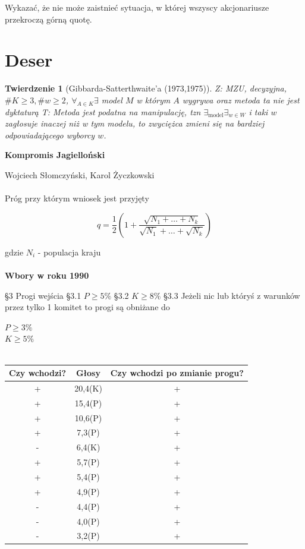 \documentclass[12pt,a4paper]{article}
\theoremstyle{break}
\newtheorem{theorem}{Twierdzenie}[section]
\begin{document}
	\begin{zad}
		Wykazać, że nie może zaistnieć sytuacja, w której wszyscy akcjonariusze przekroczą górną quotę.
	\end{zad}
	
	
	\newpage
	\section{Deser}
	
	\begin{theorem}[Gibbarda-Satterthwaite'a (1973,1975)]
		Z: MZU, decyzyjna, $\# K \geq 3, \# w \geq 2$, $\forall_{A\in K} \exists$ model $M$ w którym $A$ wygrywa oraz metoda ta nie jest dyktaturą
		T: Metoda jest podatna na manipulację, tzn 	$\exists_{ \text{model}} \exists_{w \in W}$ i taki $w$ zagłosuje inaczej niż w tym modelu, to zwyciężca zmieni się na bardziej odpowiadającego wyborcy $w$.
	\end{theorem}
	
	{\textbf{Kompromis Jagielloński}}
	
	Wojciech Słomczyński, Karol Życzkowski\\\\
	
	Próg przy którym wniosek jest przyjęty
	
	$$q=\frac{1}{2} \left(1+\frac{\sqrt{N_1+\dots+N_k}}{\sqrt{N_1}+\dots+\sqrt{N_k}}\right)$$ 
	
	gdzie $N_i$ - populacja kraju\\\\
	
	{\textbf{Wbory w roku 1990}}
	
	§3 Progi wejścia
	§3.1 $P\geq 5\%$
	§3.2 $K\geq 8\%$
	§3.3 Jeżeli nic lub któryś z warunków przez tylko 1 komitet to progi są obniżane do 
	
	$P\geq 3\%$\\
	$K\geq 5\%$\\\\
	
	\begin{tabular}{|c|c|c|}\hline
		Czy wchodzi? & Głosy & Czy wchodzi po zmianie progu?\\\hline
		+&20,4(K)&+\\\hline
		+&15,4(P)&+\\\hline
		+&10,6(P)&+\\\hline
		+&7,3(P)&+\\\hline
		-&6,4(K)&+\\\hline
		+&5,7(P)&+\\\hline
		+&5,4(P)&+\\\hline
		+&4,9(P)&+\\\hline
		-&4,4(P)&+\\\hline
		-&4,0(P)&+\\\hline
		-&3,2(P)&+\\\hline
		
	\end{tabular}\\\\
	
\end{document}
